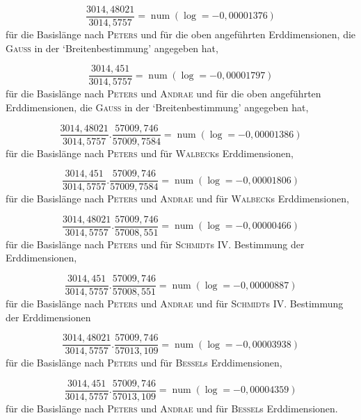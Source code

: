 %
\[
\dfrac{3014{,}48021}{3014{,}5757}=\operatorname{num}(\log=-0{,}00001376)
\]
\noindent für die Basislänge nach \textsc{Peters} und für die oben angeführten Erddimensionen, die \textsc{Gauss} in der ‘Breitenbestimmung’ angegeben hat,
\par

\[
\dfrac{3014{,}451}{3014{,}5757}=\operatorname{num}(\log=-0{,}00001797)
\]
\noindent für die Basislänge nach \textsc{Peters} und \textsc{Andrae} und für die oben angeführten Erddimensionen, die \textsc{Gauss} in der ‘Breitenbestimmung’ angegeben hat,
\par

\[
\dfrac{3014{,}48021}{3014{,}5757}.\dfrac{57009{,}746}{57009{,}7584}=\operatorname{num}(\log=-0{,}00001386)
\]
\noindent für die Basislänge nach \textsc{Peters} und für \textsc{Walbeck}s Erddimensionen,
\par

\[
\dfrac{3014{,}451}{3014{,}5757}.\dfrac{57009{,}746}{57009{,}7584}=\operatorname{num}(\log=-0{,}00001806)
\]
\noindent für die Basislänge nach \textsc{Peters} und \textsc{Andrae} und für \textsc{Walbeck}s Erddimensionen,
\par

\[
\dfrac{3014{,}48021}{3014{,}5757}.\dfrac{57009{,}746}{57008{,}551}=\operatorname{num}(\log=-0{,}00000466)
\]
\noindent für die Basislänge nach \textsc{Peters} und für \textsc{Schmidt}s IV. Bestimmung der Erddimensionen,
\par

\[
\dfrac{3014{,}451}{3014{,}5757}.\dfrac{57009{,}746}{57008{,}551}=\operatorname{num}(\log=-0{,}00000887)
\]
\noindent für die Basislänge nach \textsc{Peters} und \textsc{Andrae} und für \textsc{Schmidt}s IV. Bestimmung der Erddimensionen
\par

\[
\dfrac{3014{,}48021}{3014{,}5757}.\dfrac{57009{,}746}{57013{,}109}=\operatorname{num}(\log=-0{,}00003938)
\]
\noindent für die Basislänge nach \textsc{Peters} und für \textsc{Bessel}s Erddimensionen,
\par

\[
\dfrac{3014{,}451}{3014{,}5757}.\dfrac{57009{,}746}{57013{,}109}=\operatorname{num}(\log=-0{,}00004359)
\]
\noindent für die Basislänge nach \textsc{Peters} und \textsc{Andrae} und für \textsc{Bessel}s Erddimensionen.
\par

